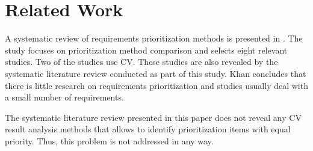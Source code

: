 \section{Related Work\label{relatedwork}}

A systematic review of requirements prioritization methods is presented in \citep{Khan2006}. The study focuses on prioritization method comparison and selects eight relevant studies. Two of the studies use CV. These studies are also revealed by the systematic literature review conducted as part of this study. Khan \cite{Khan2006} concludes that there is little research on requirements prioritization and studies usually deal with a small number of requirements.

The systematic literature review presented in this paper does not reveal any CV result analysis methods that allows to identify prioritization items with equal priority. Thus, this problem is not addressed in any way.
